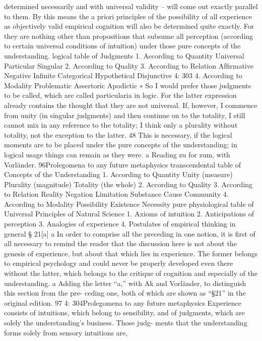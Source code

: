 determined necessarily and with universal validity – will come out exactly
parallel to them. By this means the a priori principles of the possibility
of all experience as objectively valid empirical cognition will also be
determined quite exactly. For they are nothing other than propositions
that subsume all perception (according to certain universal conditions of
intuition) under those pure concepts of the understanding.
logical table
of Judgments
1.
According to Quantity
Universal
Particular
Singular
2.
According to Quality 3.
According to Relation
Afﬁrmative
Negative
Inﬁnite Categorical
Hypothetical
Disjunctive
4: 303
4.
According to Modality
Problematic
Assertoric
Apodictic
∗ So I would prefer those judgments to be called, which are called particularia in
logic. For the latter expression already contains the thought that they are not
universal. If, however, I commence from unity (in singular judgments) and then
continue on to the totality, I still cannot mix in any reference to the totality; I
think only a plurality without totality, not the exception to the latter. 48 This is
necessary, if the logical moments are to be placed under the pure concepts of
the understanding; in logical usage things can remain as they were.
a Reading zu for zum, with Vorländer.
96Prolegomena to any future metaphysics
transcendental table
of Concepts of the Understanding
1.
According to Quantity
Unity (measure)
Plurality (magnitude)
Totality (the whole)
2.
According to Quality 3.
According to Relation
Reality
Negation
Limitation Substance
Cause
Community
4.
According to Modality
Possibility
Existence
Necessity
pure physiological table
of Universal Principles of Natural Science
1.
Axioms
of intuition
2.
Anticipations
of perception
3.
Analogies
of experience
4.
Postulates
of empirical thinking in general
§ 21[a] a
In order to comprise all the preceding in one notion, it is ﬁrst of all
necessary to remind the reader that the discussion here is not about
the genesis of experience, but about that which lies in experience. The
former belongs to empirical psychology and could never be properly
developed even there without the latter, which belongs to the critique of
cognition and especially of the understanding.
a
Adding the letter “a,” with Ak and Vorländer, to distinguish this section from the pre-
ceding one, both of which are shown as “§21” in the original edition.
97
4: 304Prolegomena to any future metaphysics
Experience consists of intuitions, which belong to sensibility, and of
judgments, which are solely the understanding’s business. Those judg-
ments that the understanding forms solely from sensory intuitions are,
